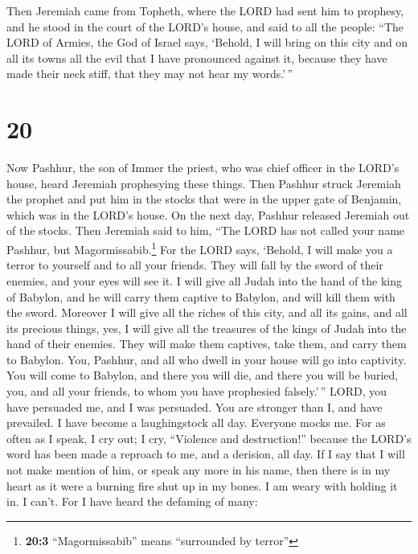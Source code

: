  Then Jeremiah came from Topheth, where the LORD had sent
him to prophesy, and he stood in the court of the LORD's house, and said
to all the people:  ``The LORD of Armies, the God of
Israel says, `Behold, I will bring on this city and on all its towns all
the evil that I have pronounced against it, because they have made their
neck stiff, that they may not hear my words.'\,''

\hypertarget{section-19}{%
\section{20}\label{section-19}}

 Now Pashhur, the son of Immer the priest, who was chief
officer in the LORD's house, heard Jeremiah prophesying these things.
 Then Pashhur struck Jeremiah the prophet and put him in
the stocks that were in the upper gate of Benjamin, which was in the
LORD's house.  On the next day, Pashhur released Jeremiah
out of the stocks. Then Jeremiah said to him, ``The LORD has not called
your name Pashhur, but Magormissabib.\footnote{\textbf{20:3}
  ``Magormissabib'' means ``surrounded by terror''}  For
the LORD says, `Behold, I will make you a terror to yourself and to all
your friends. They will fall by the sword of their enemies, and your
eyes will see it. I will give all Judah into the hand of the king of
Babylon, and he will carry them captive to Babylon, and will kill them
with the sword.  Moreover I will give all the riches of
this city, and all its gains, and all its precious things, yes, I will
give all the treasures of the kings of Judah into the hand of their
enemies. They will make them captives, take them, and carry them to
Babylon.  You, Pashhur, and all who dwell in your house
will go into captivity. You will come to Babylon, and there you will
die, and there you will be buried, you, and all your friends, to whom
you have prophesied falsely.'\,''  LORD, you have
persuaded me, and I was persuaded. You are stronger than I, and have
prevailed. I have become a laughingstock all day. Everyone mocks me.
 For as often as I speak, I cry out; I cry, ``Violence and
destruction!'' because the LORD's word has been made a reproach to me,
and a derision, all day.  If I say that I will not make
mention of him, or speak any more in his name, then there is in my heart
as it were a burning fire shut up in my bones. I am weary with holding
it in. I can't.  For I have heard the defaming of many:
